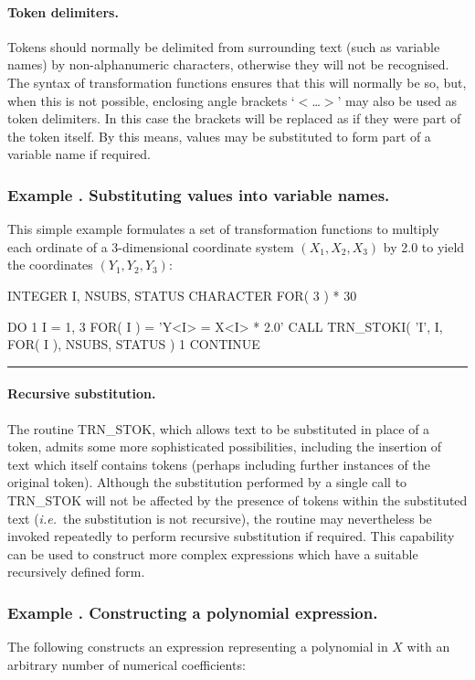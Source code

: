 \documentclass[twoside,nolof,11pt]{starlink}
\providecommand{\name}[1]{\small{#1}}
\newcounter{examplecounter}
\providecommand{\example}[1]{\addtocounter{examplecounter}{1}
                         \subsubsection*{Example \theexamplecounter. #1}}
\providecommand{\exampledone}[0]{\begin{center} \rule{6em}{0.2mm} \end{center}}
\begin{document}
\paragraph{Token delimiters.}
Tokens should normally be delimited from surrounding text (such as variable
names) by non-alphanumeric characters, otherwise they will not be
recognised.
The syntax of transformation functions ensures that this will normally be
so, but, when this is not possible, enclosing angle brackets `$<$\ldots $>$'
may also be used as token delimiters.
In this case the brackets will be replaced as if they were part of the token
itself.
By this means, values may be substituted to form part of a variable name if
required.

\example{Substituting values into variable names.}
This simple example formulates a set of transformation functions to multiply
each ordinate of a 3-dimensional coordinate system \mbox{$(X_1,X_2,X_3)$} by
2.0 to yield the coordinates \mbox{$(Y_1,Y_2,Y_3)$}:

\begin{terminalv}
       INTEGER I, NSUBS, STATUS
       CHARACTER FOR( 3 ) * 30

       DO 1 I = 1, 3
          FOR( I ) = 'Y<I> = X<I> * 2.0'
          CALL TRN_STOKI( 'I', I, FOR( I ), NSUBS, STATUS )
     1 CONTINUE
\end{terminalv}
\exampledone

\paragraph{Recursive substitution.}
The routine \name{TRN\_STOK}, which allows text to be substituted in place
of a token, admits some more sophisticated possibilities, including the
insertion of text which itself contains tokens (perhaps including further
instances of the original token).
Although the substitution performed by a single call to \name{TRN\_STOK}
will not be affected by the presence of tokens within the substituted text
(\emph{i.e.}\ the substitution is not recursive), the routine may nevertheless
be invoked repeatedly to perform recursive substitution if required.
This capability can be used to construct more complex expressions which have
a suitable recursively defined form.

\example{Constructing a polynomial expression.}
The following constructs an expression representing a polynomial in $X$ with
an arbitrary number of numerical coefficients:
\end{document}
